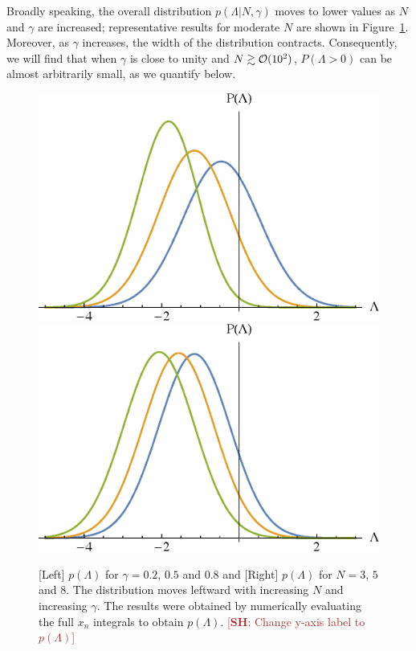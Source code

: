 \documentclass[12pt]{article}
\newcommand{\SH}[1]{\textcolor{brown}{[{\bf SH}: #1]}}
\begin{document}
Broadly speaking, the overall distribution $p(\Lambda | N,\gamma)$ moves to lower values as $N$ and $\gamma$ are increased;  representative results for moderate $N$ are shown in Figure~\ref{distributions}. Moreover, as $\gamma$ increases, the width of the distribution contracts. Consequently, we will find that when $\gamma$ is close to unity and $N \gtrsim {\cal{O}}(10^2)$, $P(\Lambda >0)$ can be almost arbitrarily small, as we quantify below. 


\begin{figure}
  \centering
  \includegraphics[width=0.45 \linewidth]{PLam_gamma.eps}  \hfill
  \includegraphics[width=0.45 \linewidth]{PLam_N.eps}
  \caption{[Left] $p(\Lambda)$ for $\gamma = 0.2$, $0.5$ and $0.8$ and [Right] $p(\Lambda)$ for $N=3$, $5$ and $8$. The distribution moves leftward with increasing $N$ and increasing $\gamma$. The results were obtained by numerically evaluating the full $x_n$ integrals to obtain $p(\Lambda)$. \SH{Change y-axis label to $p(\Lambda)$} }
  \label{distributions}
  \end{figure}
\end{document}
